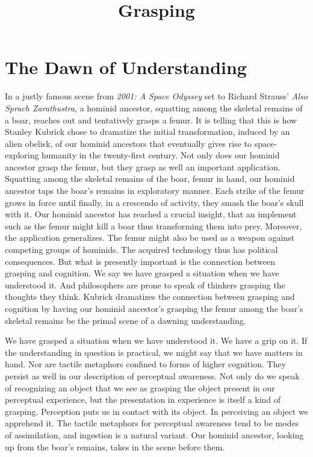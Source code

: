 \documentclass[12pt]{article}
\title{Grasping}
\author{\myauthor}
\date{} %
\begin{document}
\maketitle

\setlength{\parindent}{1em}


\section{The Dawn of Understanding} %
\label{sec:grasping_and_the_dawn_of_understanding}

In a justly famous scene from \emph{2001: A Space Odyssey} set to Richard Strauss' \emph{Also Sprach Zarathustra}, a hominid ancestor, squatting among the skeletal remains of a boar, reaches out and tentatively grasps a femur. It is telling that this is how Stanley Kubrick chose to dramatize the initial transformation, induced by an alien obelisk, of our hominid ancestors that eventually gives rise to space-exploring humanity in the twenty-first century. Not only does our hominid ancestor grasp the femur, but they grasp as well an important application. Squatting among the skeletal remains of the boar, femur in hand, our hominid ancestor taps the boar's remains in exploratory manner. Each strike of the femur grows in force until finally, in a crescendo of activity, they smash the boar's skull with it. Our hominid ancestor has reached a crucial insight, that an implement such as the femur might kill a boar thus transforming them into prey. Moreover, the application generalizes. The femur might also be used as a weapon against competing groups of hominids. The acquired technology thus has political consequences. But what is presently important is the connection between grasping and cognition. We say we have grasped a situation when we have understood it. And philosophers are prone to speak of thinkers grasping the thoughts they think. Kubrick dramatizes the connection between grasping and cognition by having our hominid ancestor's grasping the femur among the boar's skeletal remains be the primal scene of a dawning understanding.

We have grasped a situation when we have understood it. We have a grip on it. If the understanding in question is practical, we might say that we have matters in hand. Nor are tactile metaphors confined to forms of higher cognition. They persist as well in our description of perceptual awareness. Not only do we speak of recognizing an object that we see as grasping the object present in our perceptual experience, but the presentation in experience is itself a kind of grasping. Perception puts us in contact with its object. In perceiving an object we apprehend it. The tactile metaphors for perceptual awareness tend to be modes of assimilation, and ingestion is a natural variant. Our hominid ancestor, looking up from the boar's remains, takes in the scene before them.
\end{document}
